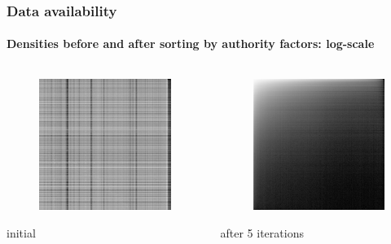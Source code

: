 \documentclass{beamer}
\begin{document}
\begin{frame}
\frametitle{Data availability}
\framesubtitle{Densities before and after sorting by authority factors:
log-scale}
\begin{columns}[T] %
\begin{column}{.48\textwidth}
\begin{figure}[h] 
    \includegraphics[width=5cm]{log_grayscale_0.png}
\end{figure}
initial
\end{column}%
\hfill%
\begin{column}{.48\textwidth}
\begin{figure}[h] 
    \includegraphics[width=5cm]{log_grayscale_5.png}
\end{figure}
after 5 iterations
\end{column}%
\end{columns}
\end{frame}
\end{document}

